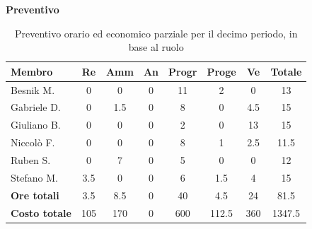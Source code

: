 \documentclass[a4paper,10pt]{article}
\begin{document}
\textbf{Preventivo} \\
\begin{table}[H]
\centering
\begin{tabular}{|l|c|c|c|c|c|c|c|}
\hline
\textbf{Membro} & \textbf{Re} & \textbf{Amm} & \textbf{An} & \textbf{Progr} & \textbf{Proge} & \textbf{Ve} & \textbf{Totale} \\
\hline
Besnik M.   & 0   & 0   & 0 & 11   & 2 & 0 & 13 \\
Gabriele D. & 0   & 1.5   & 0 & 8   & 0 & 4.5  & 15 \\
Giuliano B. & 0   & 0   & 0 & 2   & 0 & 13  & 15 \\
Niccolò F.  & 0   & 0   & 0 & 8   & 1 & 2.5  & 11.5 \\
Ruben S.    & 0   & 7   & 0 & 5   & 0 & 0  & 12 \\
Stefano M.  & 3.5   & 0   & 0 & 6   & 1.5 & 4  & 15 \\
\hline
\textbf{Ore totali} & 3.5  & 8.5 & 0 & 40  & 4.5  & 24 & 81.5 \\
\hline
\textbf{Costo totale} & 105 & 170 & 0 & 600  & 112.5  & 360 & 1347.5 \\
\hline
\end{tabular}
\caption{Preventivo orario ed economico parziale per il decimo periodo, in base al ruolo}
\end{table}
\end{document}
